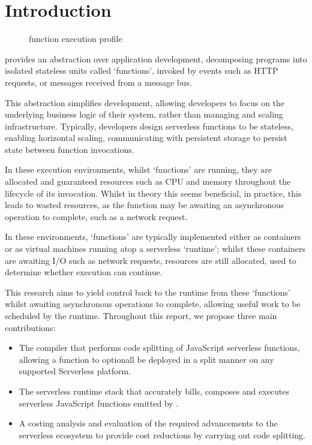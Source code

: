 \chapter{Introduction}

\begin{figure}
    \begin{center}
        
    \end{center}
    \caption{\faas{} function execution profile}
\end{figure}

\faasxlong{} provides an abstraction over application development, decomposing programs into isolated stateless units called `functions', invoked by events such as HTTP requests, or messages received from a message bus\cite{ibmWhatFaaSFunctionasaService2024}.

This abstraction simplifies development, allowing developers to focus on the underlying business logic of their system, rather than managing and scaling infrastructure. Typically, developers design serverless functions to be stateless\cite{ggailey777AzureFunctionsBest2022}, enabling horizontal scaling\cite{ngoEvaluatingScalabilityElasticity2022}, communicating with persistent storage to persist state between function invocations.

In these execution environments, whilst `functions' are running, they are allocated and guaranteed resources such as CPU and memory throughout the lifecycle of its invocation. Whilst in theory this seems beneficial, in practice, this leads to wasted resources, as the function may be awaiting an asynchronous operation to complete, such as a network request.

In these environments, `functions' are typically implemented either as containers or as virtual machines running atop a serverless `runtime'; whilst these containers are awaiting I/O such as network requests, resources are still allocated, used to determine whether execution can continue.

This research aims to yield control back to the runtime from these `functions' whilst awaiting asynchronous operations to complete, allowing useful work to be scheduled by the runtime. Throughout this report, we propose three main contributions:

\begin{itemize}
    \item The \faaasc{} compiler that performs code splitting of JavaScript serverless functions, allowing a function to optionall be deployed in a split manner on any supported Serverless\cite{serverlessServerlessZeroFrictionServerless2024} platform.

    \item The \faaastime{} serverless runtime stack that accurately bills, composes and executes serverless JavaScript functions emitted by \faaasc{}.

    \item A costing analysis and evaluation of the required advancements to the serverless ecosystem to provide cost reductions by carrying out code splitting.
\end{itemize}

